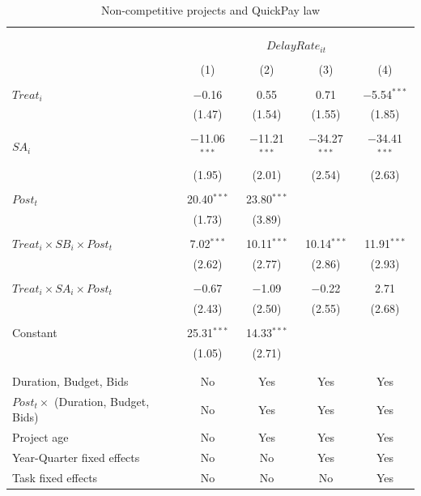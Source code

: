 \documentclass[]{article}
\begin{document}
\begin{table}[H] \centering 
  \caption{Non-competitive projects and QuickPay law} 
  \label{} 
\small 
\begin{tabular}{@{\extracolsep{-2pt}}lcccc} 
\\[-1.8ex]\hline 
\hline \\[-1.8ex] 
\\[-1.8ex] & \multicolumn{4}{c}{$DelayRate_{it}$  } \\ 
\\[-1.8ex] & (1) & (2) & (3) & (4)\\ 
\hline \\[-1.8ex] 
 $Treat_i$ & $-$0.16 & 0.55 & 0.71 & $-$5.54$^{***}$ \\ 
  & (1.47) & (1.54) & (1.55) & (1.85) \\ 
  & & & & \\ 
 $SA_i$ & $-$11.06$^{***}$ & $-$11.21$^{***}$ & $-$34.27$^{***}$ & $-$34.41$^{***}$ \\ 
  & (1.95) & (2.01) & (2.54) & (2.63) \\ 
  & & & & \\ 
 $Post_t$ & 20.40$^{***}$ & 23.80$^{***}$ &  &  \\ 
  & (1.73) & (3.89) &  &  \\ 
  & & & & \\ 
 $Treat_i \times SB_i \times Post_t$ & 7.02$^{***}$ & 10.11$^{***}$ & 10.14$^{***}$ & 11.91$^{***}$ \\ 
  & (2.62) & (2.77) & (2.86) & (2.93) \\ 
  & & & & \\ 
 $Treat_i \times SA_i \times Post_t$ & $-$0.67 & $-$1.09 & $-$0.22 & 2.71 \\ 
  & (2.43) & (2.50) & (2.55) & (2.68) \\ 
  & & & & \\ 
 Constant & 25.31$^{***}$ & 14.33$^{***}$ &  &  \\ 
  & (1.05) & (2.71) &  &  \\ 
  & & & & \\ 
\hline \\[-1.8ex] 
Duration, Budget, Bids & No & Yes & Yes & Yes \\ 
$Post_t \times $  (Duration, Budget, Bids) & No & Yes & Yes & Yes \\ 
Project age & No & Yes & Yes & Yes \\ 
Year-Quarter fixed effects & No & No & Yes & Yes \\ 
Task fixed effects & No & No & No & Yes \\ 

\end{tabular}
\end{table}
\end{document}
